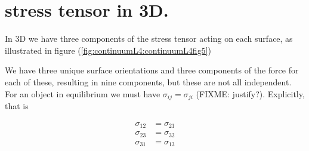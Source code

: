 \section{stress tensor in 3D.}

In 3D we have three components of the stress tensor acting on each surface, as illustrated in figure (\ref{fig:continuumL4:continuumL4fig5})

We have three unique surface orientations and three components of the force for each of these, resulting in nine components, but these are not all independent.  For an object in equilibrium we must have $\sigma_{ij} = \sigma_{ji}$ (FIXME: justify?).  Explicitly, that is

\begin{align}\label{eqn:continuumL4:110}
\sigma_{12} &= \sigma_{21} \\
\sigma_{23} &= \sigma_{32} \\
\sigma_{31} &= \sigma_{13}
\end{align}

